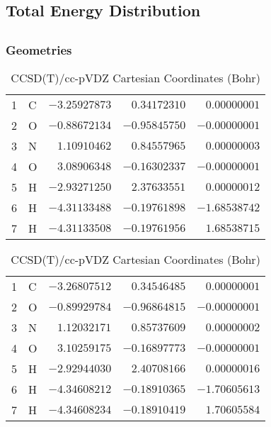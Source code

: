 \documentclass[10pt,oneside]{article}
\begin{document}
\begin{table}
\subsection*{Total Energy Distribution}
\centering\end{table}

\clearpage

\subsection{}

\begin{table}[h!]
\subsubsection*{Geometries}
\begin{multicols}{2}
\centering
\caption{CCSD(T)/cc-pVTZ Cartesian Coordinates (Bohr)}
\begin{tabular}{llrrr}
\toprule
1  & C  & $-3.25927873$ & $ 0.34172310$ & $ 0.00000001$ \\
2  & O  & $-0.88672134$ & $-0.95845750$ & $-0.00000001$ \\
3  & N  & $ 1.10910462$ & $ 0.84557965$ & $ 0.00000003$ \\
4  & O  & $ 3.08906348$ & $-0.16302337$ & $-0.00000001$ \\
5  & H  & $-2.93271250$ & $ 2.37633551$ & $ 0.00000012$ \\
6  & H  & $-4.31133488$ & $-0.19761898$ & $-1.68538742$ \\
7  & H  & $-4.31133508$ & $-0.19761956$ & $ 1.68538715$ \\
\bottomrule
\end{tabular}
\caption{CCSD(T)/cc-pVDZ Cartesian Coordinates (Bohr)}
\begin{tabular}{llrrr}
\toprule
1  & C  & $-3.26807512$ & $ 0.34546485$ & $ 0.00000001$ \\
2  & O  & $-0.89929784$ & $-0.96864815$ & $-0.00000001$ \\
3  & N  & $ 1.12032171$ & $ 0.85737609$ & $ 0.00000002$ \\
4  & O  & $ 3.10259175$ & $-0.16897773$ & $-0.00000001$ \\
5  & H  & $-2.92944030$ & $ 2.40708166$ & $ 0.00000016$ \\
6  & H  & $-4.34608212$ & $-0.18910365$ & $-1.70605613$ \\
7  & H  & $-4.34608234$ & $-0.18910419$ & $ 1.70605584$ \\
\bottomrule
\end{tabular}
\end{multicols}
\end{table}
\end{document}
